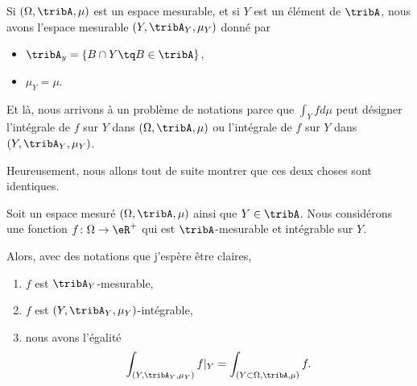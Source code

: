 \begin{normaltext}
	Si \( (\Omega,\tribA,\mu)\) est un espace mesurable, et si \( Y\) est un élément de \( \tribA\), nous avons l'espace mesurable \( (Y,\tribA_Y,\mu_Y)\) donné par
	\begin{itemize}
		\item \( \tribA_y=\{ B\cap Y\tq B\in \tribA \}\),
		\item \( \mu_Y=\mu\).
	\end{itemize}
	Et là, nous arrivons à un problème de notations parce que \( \int_Yfd\mu\) peut désigner l'intégrale de \( f\) sur \( Y\) dans \( (\Omega,\tribA,\mu)\) ou l'intégrale de \( f\) sur \( Y\) dans \( (Y,\tribA_Y,\mu_Y)\).

	Heureusement, nous allons tout de suite montrer que ces deux choses sont identiques.
\end{normaltext}


\begin{lemma}
	Soit un espace mesuré \( (\Omega,\tribA,\mu)\) ainsi que \( Y\in\tribA\). Nous considérons une fonction \( f\colon \Omega\to \eR^+\) qui est \( \tribA\)-mesurable et intégrable sur \( Y\).

	Alors, avec des notations que j'espère être claires,
	\begin{enumerate}
		\item
		      \( f\) est \( \tribA_Y\)-mesurable,
		\item
		      \( f\) est \( (Y,\tribA_Y,\mu_Y)\)-intégrable,
		\item
		      nous avons l'égalité
		      \begin{equation}
			      \int_{(Y,\tribA_Y,\mu_Y)}f|_Y=\int_{(Y\subset \Omega,\tribA,\mu)}f.
		      \end{equation}
	\end{enumerate}
\end{lemma}

